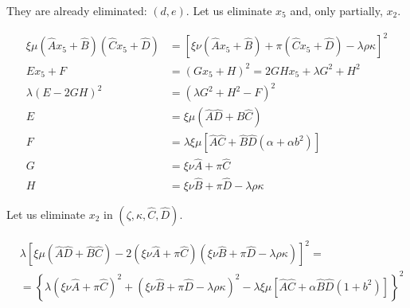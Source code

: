 \documentclass[12pt]{article}
\numberwithin{table}{section}
\begin{document}
They are already eliminated: $(d,e)$. Let us eliminate $x_5$ and, only partially, $x_2$.

\begin{align}
\xi \mu (\hat A x_5 + \hat B)(\hat C x_5 + \hat D)  &= \left[ \xi\nu (\hat A x_5 + \hat B)  + \pi (\hat C x_5 + \hat D) - \lambda \rho \kappa \right]^2 \\
E x_5 + F  &= ( G x_5 + H )^2 = 2GH x_5 + \lambda G^2 + H^2 \\
\lambda (E - 2GH)^2  &= \left(\lambda G^2 + H^2 - F\right)^2 \\
E &= \xi \mu(\hat A\hat D + \hat B\hat C)\\
F &= \lambda \xi \mu [\hat A\hat C + \hat B\hat D(\alpha + \alpha b^2)] \\
G &= \xi \nu \hat A + \pi \hat C \\
H &= \xi \nu \hat B + \pi \hat D - \lambda \rho \kappa
\end{align}

Let us eliminate $x_2$ in $(\zeta,\kappa, \hat C, \hat D)$.

\footnotesize

\begin{align}
&\lambda \left[\xi \mu(\hat A\hat D + \hat B\hat C) - 2\left(\xi \nu \hat A + \pi \hat C\right) \left(\xi \nu \hat B + \pi \hat D - \lambda \rho \kappa\right) \right]^2 = \nonumber\\
&= \left\{\lambda \left(\xi \nu \hat A + \pi \hat C\right)^2 + \left(\xi \nu \hat B   + \pi \hat D - \lambda \rho \kappa\right) ^2 - \lambda \xi \mu [\hat A\hat C + \alpha\hat B\hat D(1 + b^2)]\right\}^2 
\end{align}

\normalsize
\end{document}
